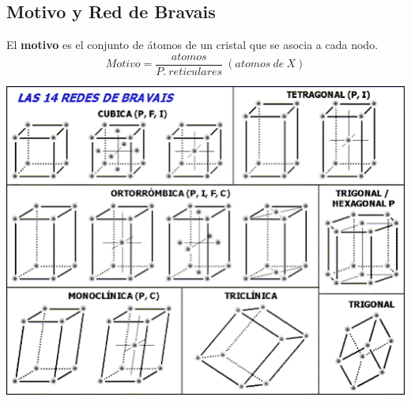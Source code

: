 \documentclass[12pt]{article}
\begin{document}
	\subsection{Motivo y Red de Bravais}
El \textbf{motivo} es el conjunto de átomos de un cristal que se asocia a cada nodo. \[Motivo=\frac{atomos}{P.\ reticulares} \ (atomos\ de \ X)\]

\includegraphics[scale=0.7]{Bravais}
\end{document}
